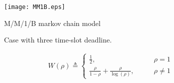
\begin{figure}[!h]
	\begin{center}
		\texttt{[image: MM1B.eps]}
		\caption{M/M/1/B markov chain model}
		\label{fig:MM1B}
		\vspace{-0.35in}
	\end{center}
	\vspace{15mm}
\end{figure}

	\begin{figure*}[htp!]
		\vspace{-0.1in}
		\centerline{ 
			\hspace{-0.2in}
				}%
		\caption{Case with three time-slot deadline.}
		\label{Fig:GeneralCase}
	\end{figure*}


\begin{align}
		W(\rho) \triangleq\begin{cases}
		\frac{1}{2}, &\qquad   \rho = 1 \\
		\frac{\rho}{1-\rho} + \frac{\rho}{\log(\rho)},  &\qquad \rho\neq 1
		\end{cases}
	\end{align}
